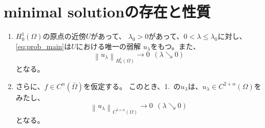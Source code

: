 \section{minimal solutionの存在と性質}

\begin{lem}
 \begin{enumerate}[1.]
  \item $H_0^1(\Omega)$の原点の近傍$U$があって、
        $\lambda_0 > 0$があって、$0 < \lambda \leq \lambda_0$に対し、
        \ref{eq:prob_main}は$U$における唯一の弱解
        $u_\lambda$をもつ。また、
        \[
        \left\| u_\lambda
        \right\|_{H^1_0(\Omega)} \to 0 \ \ (\lambda \searrow 0)
        \]
        となる。
  \item さらに、$f \in C^\alpha(\bar{\Omega})$を仮定する。
        このとき、1.~の$u_\lambda$は、$u_\lambda \in
        C^{2+\alpha}(\Omega)$を
        みたし、
        \[
        \left\| u_\lambda
        \right\|_{C^{2+\alpha}(\Omega)} \to 0 \ \ (\lambda \searrow 0)
        \]
        となる。
 \end{enumerate}
\end{lem}


